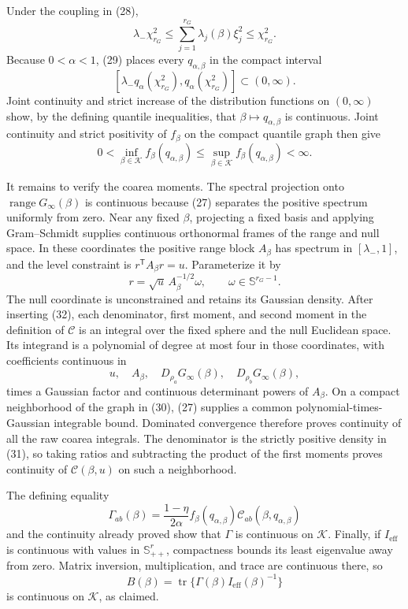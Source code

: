 Under the coupling in (28),
\[
\lambda_-\chi^2_{r_G}
\leq\sum_{j=1}^{r_G}\lambda_j(\beta)\xi_j^2
\leq\chi^2_{r_G}.
\tag{29}
\]
Because \(0<\alpha<1\), (29) places every \(q_{\alpha,\beta}\) in the compact interval
\[
\left[\lambda_-q_\alpha(\chi^2_{r_G}),
q_\alpha(\chi^2_{r_G})\right]\subset(0,\infty).
\tag{30}
\]
Joint continuity and strict increase of the distribution functions on \((0,\infty)\) show, by the defining quantile inequalities, that
\(\beta\mapsto q_{\alpha,\beta}\) is continuous.  Joint continuity and strict positivity of \(f_\beta\) on the compact quantile graph then give
\[
0<\inf_{\beta\in\mathcal K}f_\beta(q_{\alpha,\beta})
\leq\sup_{\beta\in\mathcal K}f_\beta(q_{\alpha,\beta})<\infty.
\tag{31}
\]

It remains to verify the coarea moments.  The spectral projection onto
\(\operatorname{range}G_\infty(\beta)\) is continuous because (27) separates the positive spectrum uniformly from zero.  Near any fixed \(\beta\), projecting a fixed basis and applying Gram--Schmidt supplies continuous orthonormal frames of the range and null space.  In these coordinates the positive range block \(A_\beta\) has spectrum in \([\lambda_-,1]\), and the level constraint is \(r^{\mathsf T}A_\beta r=u\).  Parameterize it by
\[
r=\sqrt u\,A_\beta^{-1/2}\omega,
\qquad \omega\in\mathbb S^{r_G-1}.
\tag{32}
\]
The null coordinate is unconstrained and retains its Gaussian density.  After inserting (32), each denominator, first moment, and second moment in the definition of \(\mathcal C\) is an integral over the fixed sphere and the null Euclidean space.  Its integrand is a polynomial of degree at most four in those coordinates, with coefficients continuous in
\[
u,\quad A_\beta,\quad
D_{\rho_a}G_\infty(\beta),\quad
D_{\rho_b}G_\infty(\beta),
\]
times a Gaussian factor and continuous determinant powers of \(A_\beta\).  On a compact neighborhood of the graph in (30), (27) supplies a common polynomial-times-Gaussian integrable bound.  Dominated convergence therefore proves continuity of all the raw coarea integrals.  The denominator is the strictly positive density in (31), so taking ratios and subtracting the product of the first moments proves continuity of
\(\mathcal C(\beta,u)\) on such a neighborhood.

The defining equality
\[
\Gamma_{ab}(\beta)
=\frac{1-\eta}{2\alpha}
f_\beta(q_{\alpha,\beta})
\mathcal C_{ab}(\beta,q_{\alpha,\beta})
\]
and the continuity already proved show that \(\Gamma\) is continuous on \(\mathcal K\).  Finally, if \(I_{\mathrm{eff}}\) is continuous with values in \(\mathbb S_{++}^r\), compactness bounds its least eigenvalue away from zero.  Matrix inversion, multiplication, and trace are continuous there, so
\[
B(\beta)=\operatorname{tr}\{\Gamma(\beta)I_{\mathrm{eff}}(\beta)^{-1}\}
\]
is continuous on \(\mathcal K\), as claimed.

